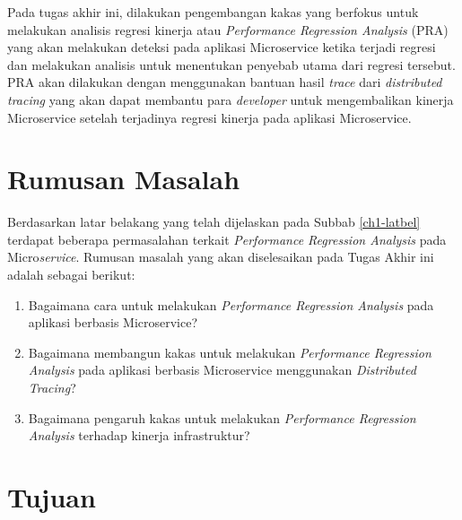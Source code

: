   
Pada tugas akhir ini, dilakukan pengembangan kakas yang berfokus untuk  melakukan analisis regresi kinerja atau \textit{Performance Regression Analysis} (PRA) yang akan melakukan deteksi pada aplikasi Microservice ketika terjadi regresi dan melakukan analisis untuk menentukan penyebab utama dari regresi tersebut. PRA akan dilakukan dengan menggunakan bantuan hasil \textit{trace} dari \textit{distributed tracing} yang akan dapat membantu para \textit{developer} untuk mengembalikan kinerja Microservice setelah terjadinya regresi kinerja pada aplikasi Microservice.

\section{Rumusan Masalah}\label{RumusanMasalah}

Berdasarkan latar belakang yang telah dijelaskan pada Subbab \ref{ch1-latbel} terdapat beberapa permasalahan terkait \textit{Performance Regression Analysis} pada Micro\textit{service}. Rumusan masalah yang akan diselesaikan pada Tugas Akhir ini adalah sebagai berikut:
\begin{enumerate}
	\item Bagaimana cara untuk melakukan \textit{Performance Regression Analysis} pada aplikasi berbasis Microservice?
	\item Bagaimana membangun kakas untuk melakukan \textit{Performance Regression Analysis} pada aplikasi berbasis Microservice menggunakan \textit{Distributed Tracing}?
	\item Bagaimana pengaruh kakas untuk melakukan \textit{Performance Regression Analysis} terhadap kinerja infrastruktur?
\end{enumerate}

\section{Tujuan}

